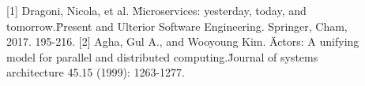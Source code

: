 \documentclass[final,hyperref={pdfpagelabels=true}]{beamer}
\begin{document}
\begin{frame}
  \vspace*{.5\baselineskip}

  \begin{columns}[t]
    \begin{column}{.04\textwidth}
    \end{column}
    \begin{column}{.92\textwidth}
      \scriptsize
      {\lmodern 
        {[1]} Dragoni, Nicola, et al. \"Microservices: yesterday, today, and tomorrow.\" Present and Ulterior Software Engineering. Springer, Cham, 2017. 195-216.
        \linebreak
        {[2]} Agha, Gul A., and Wooyoung Kim. \"Actors: A unifying model for parallel and distributed computing.\" Journal of systems architecture 45.15 (1999): 1263-1277.
      }
    \end{column}
    \begin{column}{.04\textwidth}
    \end{column}
  \end{columns}

\end{frame}
\end{document}
